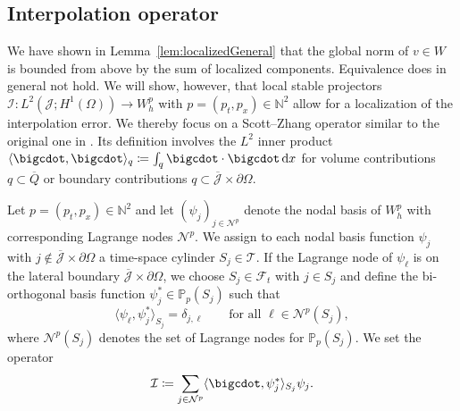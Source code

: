 \documentclass{amsart}
\providecommand{\tria}{\mathcal{T}}
\providecommand{\dx}{\,\mathrm{d}x}
\providecommand{\faces}{\mathcal{F}}
\newcommand{\cJ}{\mathcal J}
\begin{document}
\subsection{Interpolation operator}\label{subsec:FEspaces}
We have shown in Lemma~\ref{lem:localizedGeneral} that the global norm of $v\in W$ is bounded from above by the sum of localized components. Equivalence does in general not hold. We will show, however, that local stable projectors $\mathcal{I} \colon L^2(\cJ;H^1(\Omega)) \to W_{h}^p$ with $p = (p_t,p_x) \in \mathbb{N}^2$ allow for a localization of the interpolation error.
We thereby focus on a Scott--Zhang operator similar to the original one in \cite{ScottZhang90}. Its definition involves the $L^2$ inner product $\langle \bigcdot ,\bigcdot \rangle_q \coloneqq \int_q \bigcdot \cdot \bigcdot \dx$ for volume contributions $q \subset \overline{Q}$ or boundary contributions $q\subset \overline{\mathcal{J}} \times \partial \Omega$.
%
\begin{definition}\label{def:SZ}
Let $p = (p_t,p_x) \in \mathbb{N}^2$ and let $(\psi_{j})_{j \in \mathcal{N}^p}$ denote the nodal basis of $W_h^p$ with corresponding Lagrange nodes $\mathcal{N}^p$. We assign to each nodal basis function $\psi_j$ with $j\not\in \overline{\cJ}\times \partial \Omega$ a time-space cylinder $S_j \in \tria$. If the Lagrange node of $\psi_\ell$ is on the lateral boundary $\overline{\cJ} \times \partial \Omega$, we choose $S_j \in \faces_t$ with $j\in S_j$ and define the bi-orthogonal basis function $\psi_j^* \in \mathbb{P}_{p}(S_j)$ such that
\begin{equation}\label{eq:DualWeight}
\langle \psi_\ell,\psi_j^*\rangle_{S_j} = \delta_{j,\ell}\qquad\text{for all }\ell \in \mathcal{N}^p(S_j),   
\end{equation}
where $\mathcal{N}^p(S_j)$ denotes the set of Lagrange nodes for $\mathbb{P}_{p}(S_j)$.
We set the operator 
\begin{equation}\label{eq:DefI}
\mathcal{I} \coloneqq \sum_{j\in \mathcal{N}^p} \langle \bigcdot ,\psi_{j}^*\rangle_{S_j} \psi_j.
\end{equation}
\end{definition}
\end{document}
